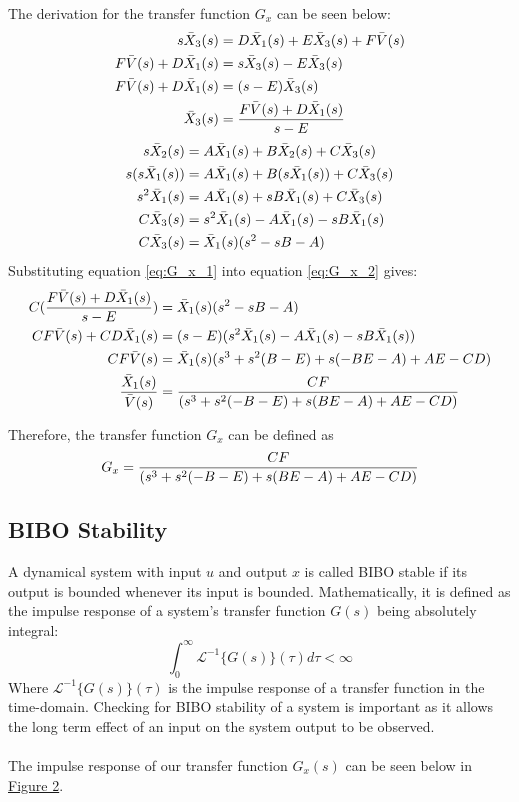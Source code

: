 \documentclass[a4paper,10pt,reqno]{amsart}
\numberwithin{equation}{section}
\newcommand{\lap}{\mathscr{L}}
\begin{document}
The derivation for the transfer function $G_x$ can be seen below:
\begin{align}
\label{eq:G_x_1}
    \notag s\bar X_3(s) &= D\bar X_1(s) + E\bar X_3(s)+F\bar V(s) \\
    \notag F\bar V(s) + D\bar X_1(s) &= s\bar X_3(s)-E\bar X_3(s) \\
    \notag F\bar V(s) + D\bar X_1(s) &= (s-E)\bar X_3(s) \\
    \bar X_3(s)&=\frac{F\bar V(s) + D\bar X_1(s)}{s-E}
\end{align}
\begin{align}
\label{eq:G_x_2}
    \notag s\bar X_2(s) &= A\bar X_1(s)+B\bar X_2(s)+C\bar X_3(s) \\
    \notag s(s\bar X_1(s)) &= A\bar X_1(s)+B(s\bar X_1(s))+C\bar X_3(s) \\
    \notag s^2\bar X_1(s) &= A\bar X_1(s)+sB\bar X_1(s)+C\bar X_3(s) \\
    \notag C\bar X_3(s) &= s^2\bar X_1(s)-A\bar X_1(s)-sB\bar X_1(s) \\
    C\bar X_3(s) &= \bar X_1(s)(s^2-sB-A)
\end{align}
Substituting equation \eqref{eq:G_x_1} into equation \eqref{eq:G_x_2} gives:
\begin{align}
    \notag C(\frac{F\bar V(s) + D\bar X_1(s)}{s-E}) &= \bar X_1(s)(s^2-sB-A) \\
    \notag CF\bar V(s) + CD\bar X_1(s) &= (s-E)(s^2\bar X_1(s)-A\bar X_1(s)-sB\bar X_1(s)) \\
    \notag CF\bar V(s) &= \bar X_1(s)(s^3 +s^2(B-E) +s(-BE-A) +AE -CD) \\
    \notag \frac{\bar X_1(s)}{\bar V(s)} &= \frac{CF}{(s^3 +s^2(-B-E) +s(BE-A) +AE -CD)}\\
\end{align}

Therefore, the transfer function $G_x$ can be defined as
\begin{equation}
    G_x = \frac{CF}{(s^3 +s^2(-B-E) +s(BE-A) +AE -CD)}\\
\end{equation}

\subsection{BIBO Stability}
A dynamical system with input $u$ and output $x$ is called BIBO stable if its output is bounded whenever its input is bounded. Mathematically, it is defined as the impulse response of a system's transfer function $G(s)$ being absolutely integral:
\begin{equation*}
    \int_{0}^{\infty} \lap^{-1}\{G(s)\}(\tau)d\tau < \infty
\end{equation*}
Where $\lap^{-1}\{G(s)\}(\tau)$ is the impulse response of a transfer function in the time-domain. Checking for BIBO stability of a system is important as it allows the long term effect of an input on the system output to be observed.
\\ \\ 
The impulse response of our transfer function $G_x(s)$ can be seen below in \hyperref[fig:no-pid-impulse]{Figure 2}.
\end{document}
